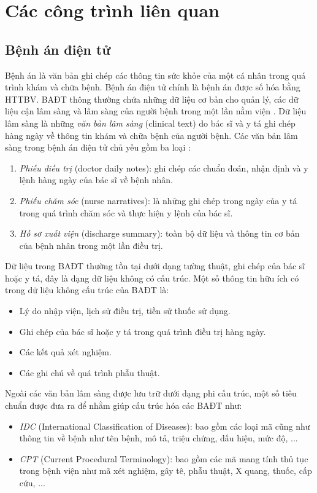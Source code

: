 \chapter{Các công trình liên quan}
\section{Bệnh án điện tử}
Bệnh án là văn bản ghi chép các thông tin sức khỏe của một cá nhân trong quá trình khám và chữa bệnh. Bệnh án điện tử chính là bệnh án được số hóa bằng HTTBV. BAĐT thông thường chứa những dữ liệu cơ bản cho quản lý, các dữ liệu cận lâm sàng và lâm sàng của người bệnh trong một lần nằm viện \cite{HoTuBao2015}. Dữ liệu lâm sàng là những \textit{văn bản lâm sàng} (clinical text) do bác sĩ và y tá ghi chép hàng ngày về thông tin khám và chữa bệnh của người bệnh. Các văn bản lâm sàng trong bệnh án điện tử chủ yếu gồm ba loại \cite{HoTuBao2015}:

\begin{enumerate}
\item \emph{Phiếu điều trị} (doctor daily notes): ghi chép các chuẩn đoán, nhận định và y lệnh hàng ngày của bác sĩ về bệnh nhân.
\item \emph{Phiếu chăm sóc} (nurse narratives): là những ghi chép trong ngày của y tá trong quá trình chăm sóc và thực hiện y lệnh của bác sĩ.
\item \emph{Hồ sơ xuất viện} (discharge summary): toàn bộ dữ liệu và thông tin cơ bản của bệnh nhân trong một lần điều trị.
\end{enumerate}

Dữ liệu trong BAĐT thường tồn tại dưới dạng tường thuật, ghi chép của bác sĩ hoặc y tá, đây là dạng dữ liệu không có cấu trúc. Một số thông tin hữu ích có trong dữ liệu không cấu trúc của BAĐT là:

\begin{itemize}
\item Lý do nhập viện, lịch sử điều trị, tiền sử thuốc sử dụng.
\item Ghi chép của bác sĩ hoặc y tá trong quá trình điều trị hàng ngày.
\item Các kết quả xét nghiệm.
\item Các ghi chú về quá trình phẫu thuật.
\end{itemize}

Ngoài các văn bản lâm sàng được lưu trữ dưới dạng phi cấu trúc, một số tiêu chuẩn được đưa ra để nhằm giúp cấu trúc hóa các BAĐT như:

\begin{itemize}
\item \emph{IDC} (International Classification of Diseases): bao gồm các loại mã cũng như thông tin về bệnh như tên bệnh, mô tả, triệu chứng, dấu hiệu, mức độ, ...
\item \textit{CPT} (Current Procedural Terminology): bao gồm các mã mang tính thủ tục trong bệnh viện như mã xét nghiệm, gây tê, phẫu thuật, X quang, thuốc, cấp cứu, ...
\end{itemize}

